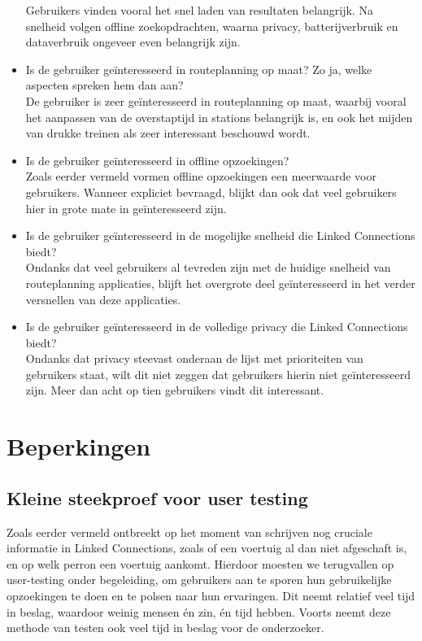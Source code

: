\begin{itemize}
	Gebruikers vinden vooral het snel laden van resultaten belangrijk. Na snelheid volgen offline zoekopdrachten, waarna privacy, batterijverbruik en dataverbruik ongeveer even belangrijk zijn.
	\item Is de gebruiker geïnteresseerd in routeplanning op maat? Zo ja, welke aspecten spreken hem dan aan?\\
	De gebruiker is zeer geïnteresseerd in routeplanning op maat, waarbij vooral het aanpassen van de overstaptijd in stations belangrijk is, en ook het mijden van drukke treinen als zeer interessant beschouwd wordt.
	\item Is de gebruiker geïnteresseerd in offline opzoekingen?\\
	Zoals eerder vermeld vormen offline opzoekingen een meerwaarde voor gebruikers. Wanneer expliciet bevraagd, blijkt dan ook dat veel gebruikers hier in grote mate in geïnteresseerd zijn.
	\item Is de gebruiker geïnteresseerd in de mogelijke snelheid die Linked Connections biedt?\\
	Ondanks dat veel gebruikers al tevreden zijn met de huidige snelheid van routeplanning applicaties, blijft het overgrote deel geïnteresseerd in het verder versnellen van deze applicaties.
	\item Is de gebruiker geïnteresseerd in de volledige privacy die Linked Connections biedt?\\
	Ondanks dat privacy steevast onderaan de lijst met prioriteiten van gebruikers staat, wilt dit niet zeggen dat gebruikers hierin niet geïnteresseerd zijn. Meer dan acht op tien gebruikers vindt dit interessant.
\end{itemize}

\section{Beperkingen}
\subsection{Kleine steekproef voor user testing}
Zoals eerder vermeld ontbreekt op het moment van schrijven nog cruciale informatie in Linked Connections, zoals of een voertuig al dan niet afgeschaft is, en op welk perron een voertuig aankomt. Hierdoor moesten we terugvallen op user-testing onder begeleiding, om gebruikers aan te sporen hun gebruikelijke opzoekingen te doen en te polsen naar hun ervaringen. Dit neemt relatief veel tijd in beslag, waardoor weinig mensen én zin, én tijd hebben. Voorts neemt deze methode van testen ook veel tijd in beslag voor de onderzoeker. 

